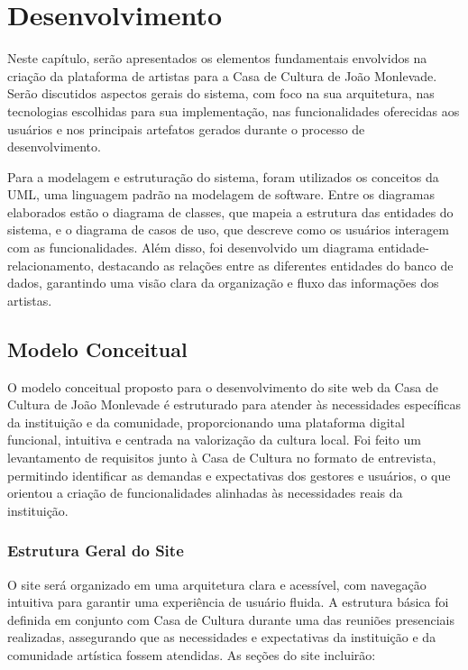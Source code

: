 \chapter{Desenvolvimento}
\label{cap:desenvolvimento}
Neste capítulo, serão apresentados os elementos fundamentais envolvidos na criação da plataforma de artistas para a Casa de Cultura de João Monlevade. Serão discutidos aspectos gerais do sistema, com foco na sua arquitetura, nas tecnologias escolhidas para sua implementação, nas funcionalidades oferecidas aos usuários e nos principais artefatos gerados durante o processo de desenvolvimento.

Para a modelagem e estruturação do sistema, foram utilizados os conceitos da UML, uma linguagem padrão na modelagem de software. Entre os diagramas elaborados estão o diagrama de classes, que mapeia a estrutura das entidades do sistema, e o diagrama de casos de uso, que descreve como os usuários interagem com as funcionalidades. Além disso, foi desenvolvido um diagrama entidade-relacionamento, destacando as relações entre as diferentes entidades do banco de dados, garantindo uma visão clara da organização e fluxo das informações dos artistas.

\section{Modelo Conceitual}

O modelo conceitual proposto para o desenvolvimento do site web da Casa de Cultura de João Monlevade é estruturado para atender às necessidades específicas da instituição e da comunidade, proporcionando uma plataforma digital funcional, intuitiva e centrada na valorização da cultura local. Foi feito um levantamento de requisitos junto à Casa de Cultura no formato de entrevista, permitindo identificar as demandas e expectativas dos gestores e usuários, o que orientou a criação de funcionalidades alinhadas às necessidades reais da instituição.

\subsection{Estrutura Geral do Site}

O site será organizado em uma arquitetura clara e acessível, com navegação intuitiva para garantir uma experiência de usuário fluida. A estrutura básica foi definida em conjunto com Casa de Cultura durante uma das reuniões presenciais realizadas, assegurando que as necessidades e expectativas da instituição e da comunidade artística fossem atendidas. As seções do site incluirão:

